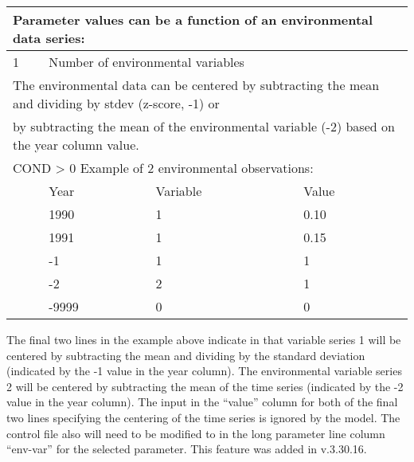 \begin{center}
	\begin{tabular}{p{1cm} p{3cm} p{3cm} p{7.5cm}}
		\multicolumn{4}{l}{Parameter values can be a function of an environmental data series: }\\
		\hline
		1 & \multicolumn{3}{l}{Number of environmental variables}\Tstrut\Bstrut\\
		\multicolumn{4}{l}{ The environmental data can be centered by subtracting the mean and dividing by stdev (z-score, -1) or }\\
		\multicolumn{4}{l}{ by subtracting the mean of the environmental variable (-2) based on the year column value. }\\
		\hline
		\multicolumn{4}{l}{COND > 0  Example of 2 environmental observations:} \Tstrut\\
		  & Year & Variable & Value \Bstrut\\
		\hline
		  & 1990 & 1 & 0.10 \Tstrut\\
		  & 1991 & 1 & 0.15 \\
		  & -1   & 1 & 1 \\
		  & -2   & 2 & 1 \\
		  & -9999 & 0 & 0 \Bstrut\\
		\hline
	\end{tabular}
\end{center}

The final two lines in the example above indicate in that variable series 1 will be centered by subtracting the mean and dividing by the standard deviation (indicated by the -1 value in the year column). The environmental variable series 2 will be centered by subtracting the mean of the time series (indicated by the -2 value in the year column).  The input in the ``value'' column for both of the final two lines specifying the centering of the time series is ignored by the model. The control file also will need to be modified to in the long parameter line column ``env-var'' for the selected parameter. This feature was added in v.3.30.16.


